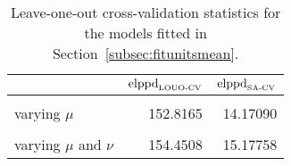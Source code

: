 \begin{table}
\centering
\caption{\label{tab:elppd_loo}Leave-one-out cross-validation statistics for the models fitted in Section~\ref{subsec:fitunitsmean}.}
\centering
\begin{tabular}[t]{lrr}
\toprule
  & $\hbox{elppd}_{\hbox{\tiny{LOUO-CV}}}$ & $\hbox{elppd}_{\hbox{\tiny{SA-CV}}}$\\
\midrule
\cellcolor{gray!10}{complete pooling} & \cellcolor{gray!10}{154.7397} & \cellcolor{gray!10}{15.41020}\\
varying $\mu$ & 152.8165 & 14.17090\\
\cellcolor{gray!10}{varying $\nu$} & \cellcolor{gray!10}{153.4844} & \cellcolor{gray!10}{15.09505}\\
varying $\mu$ and $\nu$ & 154.4508 & 15.17758\\
\bottomrule
\end{tabular}
\end{table}
